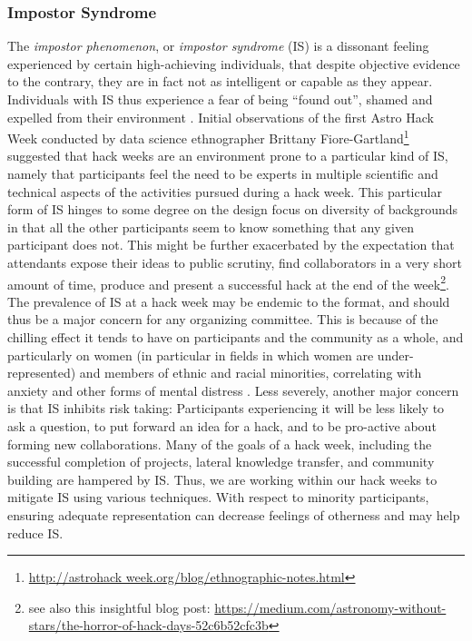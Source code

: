 \documentclass{aastex62}
\begin{document}
\subsubsection{Impostor Syndrome}

The \textit{impostor phenomenon}, or \textit{impostor syndrome} (IS) is a dissonant feeling experienced by certain high-achieving individuals, that despite objective evidence to the contrary, they are in fact not as intelligent or capable as they appear.
Individuals with IS thus experience a fear of being ``found out'', shamed and expelled from their environment \citep{Clance1978-ef}.
Initial observations of the first Astro Hack Week conducted by data science ethnographer Brittany Fiore-Gartland\footnote{\url{http://astrohack week.org/blog/ethnographic-notes.html}} suggested that hack weeks are an environment prone to a particular kind of IS, namely that participants feel the need to be experts in multiple scientific and technical aspects of the activities pursued during a hack week.
This particular form of IS hinges to some degree on the design focus on diversity of backgrounds in that all the other participants seem to know something that any given participant does not. This might be further exacerbated by the expectation that attendants expose their ideas to public scrutiny, find collaborators in a very short amount of time, produce and present a successful hack at the end of the week\footnote{see also this insightful blog post: \url{https://medium.com/astronomy-without-stars/the-horror-of-hack-days-52c6b52cfc3b}}.
The prevalence of IS at a hack week may be endemic to the format, and should thus be a major concern for any organizing committee.
This is because of the chilling effect it tends to have on participants and the community as a whole, and particularly on women (in particular in fields in which women are under-represented) and members of ethnic and racial minorities, correlating with anxiety and other forms of mental distress \citep{Parkman2016-ro}.
Less severely, another major concern is that IS inhibits risk taking: Participants experiencing it will be less likely to ask a question, to put forward an idea for a hack, and to be pro-active about forming new collaborations.
 Many of the goals of a hack week, including the successful completion of projects, lateral knowledge transfer, and community building are hampered by IS.
 Thus, we are working within our hack weeks to mitigate IS using various techniques.
With respect to minority participants, ensuring adequate representation can decrease feelings of otherness and may help reduce IS.
\end{document}
